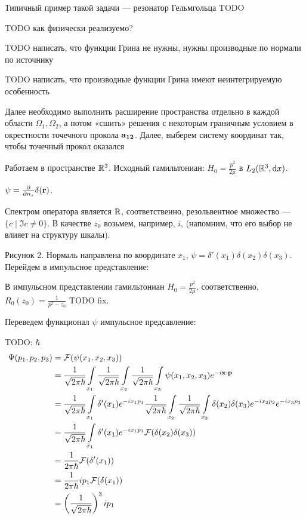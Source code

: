 Типичный пример такой задачи — резонатор Гельмгольца TODO

TODO как физически реализуемо?

TODO написать, что функции Грина не нужны, нужны производные по нормали по источнику

TODO написать, что производные функции Грина имеют неинтегрируемую особенность

Далее необходимо выполнить расширение пространства отдельно в каждой области $\Omega_1, \Omega_2$, а потом «сшить» решения с некоторым граничным условием в окрестности точечного прокола $\vb{a_{12}}$. Далее, выберем систему координат так, чтобы точечный прокол оказался 

Работаем в пространстве $\mathbb{R}^3$. Исходный гамильтониан: $H_0 = \frac{\hat{p}^2}{2 \mu}$ в $L_2(\mathbb{R}^3, \dd x)$.


$\psi = \pdv{n_s} \delta(\vb{r})$.

Спектром оператора является $\mathbb{R}$, соответственно, резольвентное множество — $\{ c \mid \Im c \ne 0 \}$. В качестве $z_0$ возьмем, например, $i$, (напомним, что его выбор не влияет на структуру шкалы).


Рисунок 2. Нормаль направлена по координате $x_1$, $\psi = \delta'(x_1) \delta(x_2) \delta(x_3)$. Перейдем в импульсное представление:

В импульсном представлении гамильтониан $H_0 = \frac{p^2}{2 \mu}$, соответственно, $R_0(z_0) = \frac{1}{p^2 - z_0}$ TODO fix.

Переведем функционал $\psi$ импульсное предсавление:

TODO: $\hbar$
\begin{align*}
\Psi(p_1, p_2, p_3)
&= \mathcal{F}(\psi(x_1, x_2, x_3)) \\
&= \frac{1}{\sqrt{2 \pi \hbar}} \int\limits_{x_1} \frac{1}{\sqrt{2 \pi \hbar}} \int\limits_{x_2} \frac{1}{\sqrt{2 \pi \hbar}} \int\limits_{x_3} \psi(x_1, x_2, x_3) e^{-i \vb{x} \vdot \vb{p}} \\
&= \frac{1}{\sqrt{2 \pi \hbar}} \int\limits_{x_1} \delta'(x_1) e^{-i x_1 p_1} \frac{1}{\sqrt{2 \pi \hbar}} \int\limits_{x_2} \frac{1}{\sqrt{2 \pi \hbar}} \int\limits_{x_3} \delta(x_2) \delta(x_3) e^{-i x_2 p_2} e^{-i x_3 p_3} \\
&= \frac{1}{\sqrt{2 \pi \hbar}} \int\limits_{x_1} \delta'(x_1) e^{-i x_1 p_1} \mathcal{F}(\delta(x_2) \delta(x_3)) \\
&= \frac{1}{2 \pi \hbar} \mathcal{F}(\delta'(x_1)) \\
&= \frac{1}{2 \pi \hbar} i p_1 \mathcal{F}(\delta(x_1)) \\
&= \left(\frac{1}{\sqrt{2 \pi \hbar}}\right)^3 i p_1
\end{align*}

